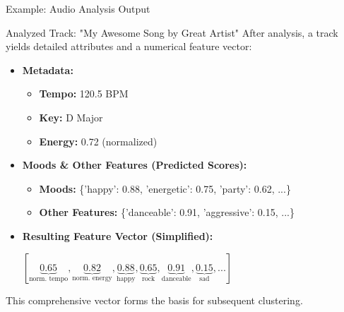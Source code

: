 \documentclass{beamer}
\begin{document}
\begin{frame}{Example: Audio Analysis Output}
    \begin{exampleblock}{Analyzed Track: "My Awesome Song by Great Artist"}
    \small
    After analysis, a track yields detailed attributes and a numerical feature vector:
    \begin{itemize}
        \item \textbf{Metadata:}
        \begin{itemize}
            \item \textbf{Tempo:} 120.5 BPM
            \item \textbf{Key:} D Major
            \item \textbf{Energy:} 0.72 (normalized)
        \end{itemize}
        \item \textbf{Moods \& Other Features (Predicted Scores):}
        \begin{itemize}
            \item \textbf{Moods:} \{'happy': 0.88, 'energetic': 0.75, 'party': 0.62, ...\}
            \item \textbf{Other Features:} \{'danceable': 0.91, 'aggressive': 0.15, ...\}
        \end{itemize}
        \item \textbf{Resulting Feature Vector (Simplified):}
        \begin{center}
            $[\underbrace{0.65}_{\text{norm. tempo}}, \underbrace{0.82}_{\text{norm. energy}}, \underbrace{0.88}_{\text{happy}}, \underbrace{0.65}_{\text{rock}}, \underbrace{0.91}_{\text{danceable}}, \underbrace{0.15}_{\text{sad}}, ...]$
        \end{center}
    \end{itemize}
    This comprehensive vector forms the basis for subsequent clustering.
    \end{exampleblock}
\end{frame}
\end{document}

